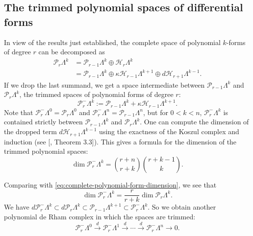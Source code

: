 \subsection{{The trimmed polynomial spaces of differential forms}}\label{sec:trimmed-polynomial-forms}

{In view of the results just established, the complete space of polynomial $k$-forms of degree $r$ can be decomposed as}
\[
\begin{aligned}
\mathcal P_r\Lambda^k&=\mathcal P_{r-1}\Lambda^k\oplus\mathcal H_r\Lambda^k\\
&=\mathcal P_{r-1}\Lambda^k\oplus\kappa\mathcal H_{r-1}\Lambda^{k+1}\oplus d\mathcal H_{r+1}\Lambda^{k-1}.
\end{aligned}
\]
{If we drop the last summand, we get a space intermediate between $\mathcal P_{r-1}\Lambda^k$ and $\mathcal P_r\Lambda^k$, the trimmed spaces of polynomial forms of degree $r$:}
\[
\mathcal P_r^-\Lambda^k:=\mathcal P_{r-1}\Lambda^k+\kappa\mathcal H_{r-1}\Lambda^{k+1}.
\]
{Note that $\mathcal P_r^-\Lambda^0=\mathcal P_r\Lambda^0$ and $\mathcal P_r^-\Lambda^n=\mathcal P_{r-1}\Lambda^n$, but for $0<k<n$, $\mathcal P_r^-\Lambda^k$ is contained strictly between $\mathcal P_{r-1}\Lambda^k$ and $\mathcal P_r\Lambda^k$. One can compute the dimension of the dropped term $d\mathcal H_{r+1}\Lambda^{k-1}$ using the exactness of the Koszul complex and induction (see [, Theorem 3.3]). This gives a formula for the dimension of the trimmed polynomial spaces:}
\[
\dim\mathcal P_r^-\Lambda^k=\binom{r+n}{r+k}\binom{r+k-1}k.
\]

{Comparing with \eqref{eq:complete-polynomial-form-dimension}, we see that}
\[
\dim\mathcal P_r^-\Lambda^k=\frac r{r+k}\dim\mathcal P_r\Lambda^k.
\]
{We have $d\mathcal P_r^-\Lambda^k\subset d\mathcal P_r\Lambda^k\subset\mathcal P_{r-1}\Lambda^{k+1}\subset\mathcal P_r^-\Lambda^k$. So we obtain another polynomial de Rham complex in which the spaces are trimmed:}
\begin{equation}\label{eq:trimmed-polynomial-de-rham-complex}
\mathcal P_r^-\Lambda^0\xrightarrow{d}\mathcal P_r^-\Lambda^1\xrightarrow{d}\cdots\xrightarrow{d}\mathcal P_r^-\Lambda^n\to0.
\end{equation}

